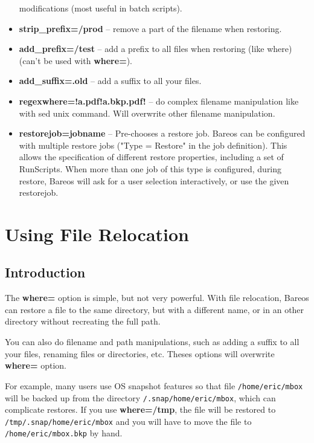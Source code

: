 \begin{itemize}
   modifications (most useful in batch scripts).
\item {\bf strip\_prefix=/prod} -- remove a part of the filename when restoring.
\item {\bf add\_prefix=/test} -- add a prefix to all files when restoring (like
  where) (can't be used with {\bf where=}).
\item {\bf add\_suffix=.old} -- add a suffix to all your files.
\item {\bf regexwhere=!a.pdf!a.bkp.pdf!} -- do complex filename manipulation
  like with sed unix command. Will overwrite other filename manipulation.
\item {\bf restorejob=jobname} -- Pre-chooses a restore job. Bareos can be
  configured with multiple restore jobs ("Type = Restore" in the job
  definition). This allows the specification of different restore properties,
  including a set of RunScripts. When more than one job of this type is
  configured, during restore, Bareos will ask for a user selection
  interactively, or use the given restorejob.
\end{itemize}

\label{restorefilerelocation}
\section{Using File Relocation}
\label{filerelocation}

\subsection{Introduction}

The \textbf{where=} option is simple, but not very powerful. With file
relocation, Bareos can restore a file to the same directory, but with a
different name, or in an other directory without recreating the full path.

You can also do filename and path manipulations,
such as adding a suffix to all your files, renaming files
or directories, etc.  Theses options will overwrite {\bf where=} option.


For example, many users use OS snapshot features so that file
\texttt{/home/eric/mbox} will be backed up from the directory
\texttt{/.snap/home/eric/mbox}, which can complicate restores.  If you use
\textbf{where=/tmp}, the file will be restored to
\texttt{/tmp/.snap/home/eric/mbox} and you will have to move the file to
\texttt{/home/eric/mbox.bkp} by hand.

